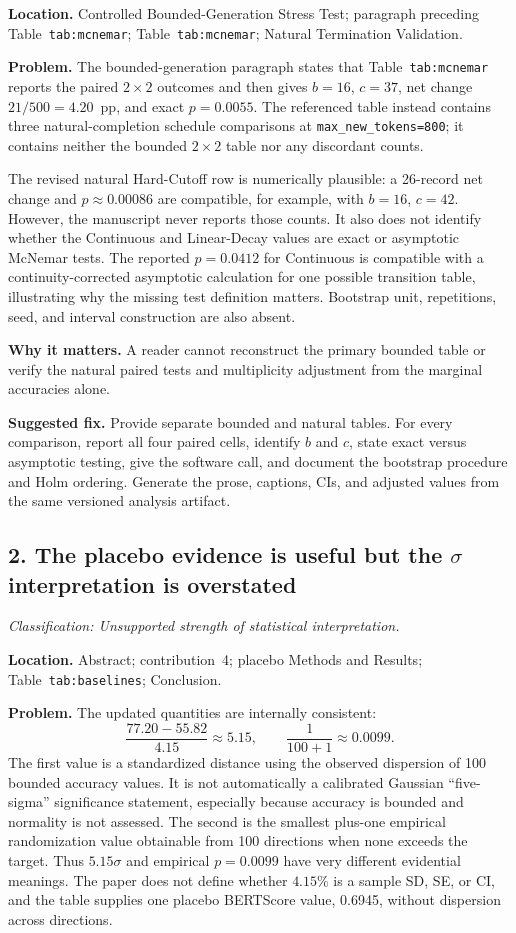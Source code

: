 \documentclass[11pt]{article}
\newcommand{\findinglabel}[1]{\textbf{#1}}
\newcommand{\classification}[1]{\textit{Classification: #1.}}
\begin{document}
\findinglabel{Location.} Controlled Bounded-Generation Stress Test; paragraph preceding Table~\texttt{tab:mcnemar}; Table~\texttt{tab:mcnemar}; Natural Termination Validation.

\findinglabel{Problem.} The bounded-generation paragraph states that Table~\texttt{tab:mcnemar} reports the paired $2\times2$ outcomes and then gives $b=16$, $c=37$, net change $21/500=4.20$~pp, and exact $p=0.0055$.  The referenced table instead contains three natural-completion schedule comparisons at \texttt{max\_new\_tokens=800}; it contains neither the bounded $2\times2$ table nor any discordant counts.

The revised natural Hard-Cutoff row is numerically plausible: a 26-record net change and $p\approx0.00086$ are compatible, for example, with $b=16$, $c=42$.  However, the manuscript never reports those counts.  It also does not identify whether the Continuous and Linear-Decay values are exact or asymptotic McNemar tests.  The reported $p=0.0412$ for Continuous is compatible with a continuity-corrected asymptotic calculation for one possible transition table, illustrating why the missing test definition matters.  Bootstrap unit, repetitions, seed, and interval construction are also absent.

\findinglabel{Why it matters.} A reader cannot reconstruct the primary bounded table or verify the natural paired tests and multiplicity adjustment from the marginal accuracies alone.

\findinglabel{Suggested fix.} Provide separate bounded and natural tables.  For every comparison, report all four paired cells, identify $b$ and $c$, state exact versus asymptotic testing, give the software call, and document the bootstrap procedure and Holm ordering.  Generate the prose, captions, CIs, and adjusted values from the same versioned analysis artifact.

\subsection*{2. The placebo evidence is useful but the $\sigma$ interpretation is overstated}

\classification{Unsupported strength of statistical interpretation}

\findinglabel{Location.} Abstract; contribution~4; placebo Methods and Results; Table~\texttt{tab:baselines}; Conclusion.

\findinglabel{Problem.} The updated quantities are internally consistent:
\[
\frac{77.20-55.82}{4.15}\approx5.15,
\qquad
\frac{1}{100+1}\approx0.0099.
\]
The first value is a standardized distance using the observed dispersion of 100 bounded accuracy values.  It is not automatically a calibrated Gaussian ``five-sigma'' significance statement, especially because accuracy is bounded and normality is not assessed.  The second is the smallest plus-one empirical randomization value obtainable from 100 directions when none exceeds the target.  Thus $5.15\sigma$ and empirical $p=0.0099$ have very different evidential meanings.  The paper does not define whether $4.15\%$ is a sample SD, SE, or CI, and the table supplies one placebo BERTScore value, 0.6945, without dispersion across directions.
\end{document}
